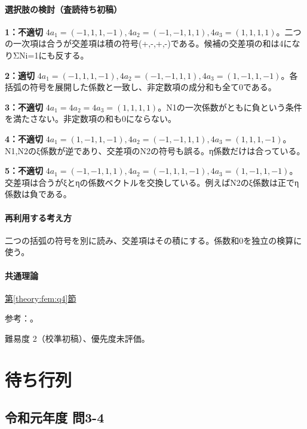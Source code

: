 \paragraph{選択肢の検討（査読待ち初稿）}\mbox{}\par

\noindent\textbf{1：不適切} \(4a_1=(-1,1,1,-1),4a_2=(-1,-1,1,1),4a_3=(1,1,1,1)\)。二つの一次項は合うが交差項は積の符号(+,-,+,-)である。候補の交差項の和は4になりΣNi=\allowbreak{}1にも反する。\par

\noindent\textbf{2：適切} \(4a_1=(-1,1,1,-1),4a_2=(-1,-1,1,1),4a_3=(1,-1,1,-1)\)。各括弧の符号を展開した係数と一致し、非定数項の成分和も全て0である。\par

\noindent\textbf{3：不適切} \(4a_1=4a_2=4a_3=(1,1,1,1)\)。N1の一次係数がともに負という条件を満たさない。非定数項の和も0にならない。\par

\noindent\textbf{4：不適切} \(4a_1=(1,-1,1,-1),4a_2=(-1,-1,1,1),4a_3=(1,1,1,-1)\)。N1,N2のξ係数が逆であり、交差項のN2の符号も誤る。η係数だけは合っている。\par

\noindent\textbf{5：不適切} \(4a_1=(-1,-1,1,1),4a_2=(-1,1,1,-1),4a_3=(1,-1,1,-1)\)。交差項は合うがξとηの係数ベクトルを交換している。例えばN2のξ係数は正でη係数は負である。\par

\paragraph{再利用する考え方} 二つの括弧の符号を別に読み、交差項はその積にする。係数和0を独立の検算に使う。

\paragraph{共通理論} \hyperref[theory:fem:q4]{第\ref*{theory:fem:q4}節}

\par 参考：\cite{mit_roy_fea1999}。

\par 難易度 2（校準初稿）、優先度未評価。

\section{待ち行列}

\subsection{令和元年度 問3-4}
\label{q:r01-reg-basic-3-4}

